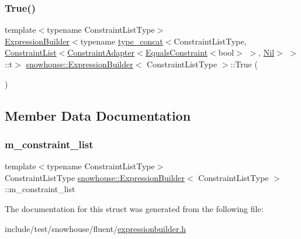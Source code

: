 \subsubsection{\texorpdfstring{True()}{True()}}
{\footnotesize\ttfamily template$<$typename Constraint\+List\+Type$>$ \\
\mbox{\hyperlink{structsnowhouse_1_1ExpressionBuilder}{Expression\+Builder}}$<$typename \mbox{\hyperlink{structsnowhouse_1_1type__concat}{type\+\_\+concat}}$<$Constraint\+List\+Type, \mbox{\hyperlink{structsnowhouse_1_1ConstraintList}{Constraint\+List}}$<$\mbox{\hyperlink{structsnowhouse_1_1ConstraintAdapter}{Constraint\+Adapter}}$<$\mbox{\hyperlink{structsnowhouse_1_1EqualsConstraint}{Equals\+Constraint}}$<$bool$>$ $>$, \mbox{\hyperlink{structsnowhouse_1_1Nil}{Nil}}$>$ $>$\+::t$>$ \mbox{\hyperlink{structsnowhouse_1_1ExpressionBuilder}{snowhouse\+::\+Expression\+Builder}}$<$ Constraint\+List\+Type $>$\+::True (\begin{DoxyParamCaption}{ }\end{DoxyParamCaption})\hspace{0.3cm}{\ttfamily [inline]}}



\subsection{Member Data Documentation}
\mbox{\label{structsnowhouse_1_1ExpressionBuilder_a1c72c0f5c07834ddd2ce3291a4b03fcc}} 
\subsubsection{\texorpdfstring{m\_constraint\_list}{m\_constraint\_list}}
{\footnotesize\ttfamily template$<$typename Constraint\+List\+Type$>$ \\
Constraint\+List\+Type \mbox{\hyperlink{structsnowhouse_1_1ExpressionBuilder}{snowhouse\+::\+Expression\+Builder}}$<$ Constraint\+List\+Type $>$\+::m\+\_\+constraint\+\_\+list}



The documentation for this struct was generated from the following file\+:\begin{DoxyCompactItemize}
\item 
include/test/snowhouse/fluent/\mbox{\hyperlink{expressionbuilder_8h}{expressionbuilder.\+h}}\end{DoxyCompactItemize}
